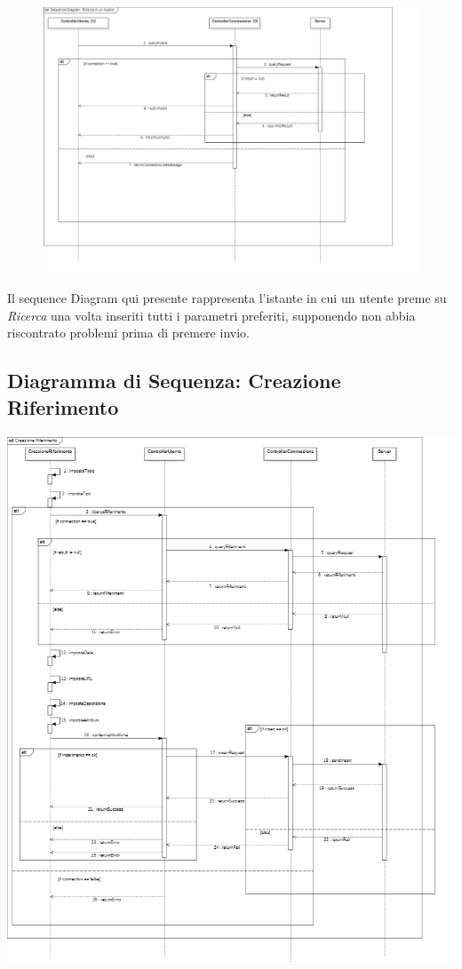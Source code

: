 \begin{figure}[H]
    \centering
            \includegraphics[width=.90\textwidth]{Immagini/Alexandria/sequenceDiagramDesign1} 
\end{figure}

Il sequence Diagram qui presente rappresenta l'istante in cui un utente preme su \textit{Ricerca} una volta inseriti tutti i parametri preferiti, supponendo non abbia riscontrato problemi prima di premere invio. 

\raggedright{\subsection{Diagramma di Sequenza: Creazione Riferimento}}

        \begin{center}
            \includegraphics[width=.95\textwidth]{Immagini/Alexandria/sequenceDiagramDesign2.PNG} 
        \end{center}

